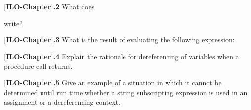 \noindent \textbf{\ref*{ILO-Chapter}.2}
What does


\noindent write?

\noindent
\textbf{\ref*{ILO-Chapter}.3}
What is the result of evaluating the following expression:


\noindent \textbf{\ref*{ILO-Chapter}.4}
Explain the rationale for dereferencing of
variables when a procedure call returns.

\noindent \textbf{\ref*{ILO-Chapter}.5}
Give an example of a situation in which it
cannot be determined until run time whether a string subscripting
expression is used in an assignment or a dereferencing context.
